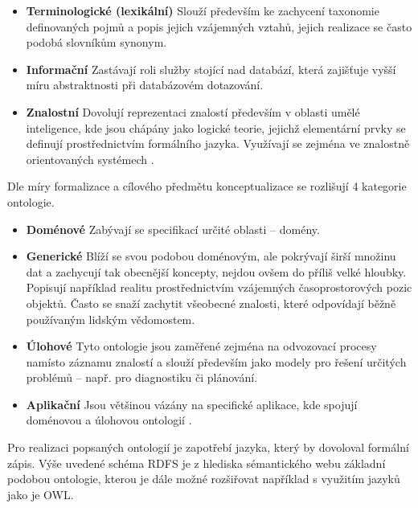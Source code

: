 \documentclass{projekt}
\begin{document}
\begin {itemize}

\item \textbf{Terminologické (lexikální)} Slouží především ke zachycení taxonomie definovaných pojmů a popis jejich vzájemných vztahů, jejich realizace se často podobá slovníkům synonym.
\item \textbf{Informační} Zastávají roli služby stojící nad databází, která zajišťuje vyšší míru abstraktnosti při databázovém dotazování.
\item \textbf{Znalostní} Dovolují reprezentaci znalostí především v oblasti umělé inteligence, kde jsou chápány jako logické teorie, jejichž elementární prvky se definují prostřednictvím formálního jazyka. Využívají se zejména ve znalostně orientovaných systémech \cite{_10}.

\end{itemize}

Dle míry formalizace a cílového předmětu konceptualizace se rozlišují 4 kategorie ontologie.

\begin {itemize}

\item \textbf{Doménové} Zabývají se specifikací určité oblasti – domény.
\item \textbf{Generické} Blíží se svou podobou doménovým, ale pokrývají širší množinu dat a zachycují tak obecnější koncepty, nejdou ovšem do příliš velké hloubky. Popisují například realitu prostřednictvím vzájemných časoprostorových pozic objektů. Často se snaží zachytit všeobecné znalosti, které odpovídají běžně používaným lidským vědomostem.
\item \textbf{Úlohové} Tyto ontologie jsou zaměřené zejména na odvozovací procesy namísto záznamu znalostí a slouží především jako modely pro řešení určitých problémů – např. pro diagnostiku či plánování.
\item \textbf{Aplikační} Jsou většinou vázány na specifické aplikace, kde spojují doménovou a úlohovou ontologií \cite{_10}.
\end{itemize}

Pro realizaci popsaných ontologií je zapotřebí jazyka, který by dovoloval formální zápis. Výše uvedené schéma RDFS je z hlediska sémantického webu základní podobou ontologie, kterou je dále možné rozšiřovat například s využitím jazyků jako je OWL.
\end{document}
